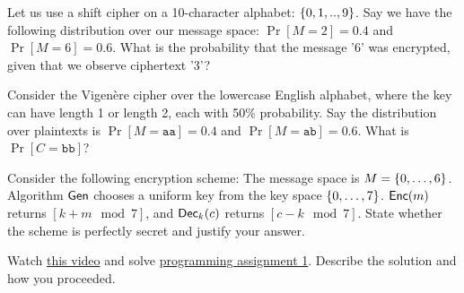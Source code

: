 \documentclass[a4paper,10pt]{article}
\begin{document}
\begin{question}{1}
Let us use a shift cipher on a 10-character alphabet: $\{0,1,..,9\}$. Say we have the following distribution over our message space:
$\Pr[M=2]=0.4$ and $\Pr[M=6]=0.6$. What is the probability that the message '6' was encrypted, given that we observe ciphertext '3'?
\end{question}

\begin{solution}
\end{solution}


\begin{question}{1}
Consider the Vigenère cipher over the lowercase English alphabet, where the key can have length 1 or length 2, each with 50\% probability. Say the distribution over plaintexts is $\Pr[M=\mathtt{aa}]=0.4$ and $\Pr[M=\mathtt{ab}]=0.6$. What is $\Pr[C=\mathtt{bb}]$?
\end{question}

\begin{solution}
\end{solution}

\begin{question}{2}
 Consider the following encryption scheme: The message space is $M=\{0,\ldots,6\}$. Algorithm $\mathsf{Gen}$ chooses a uniform key from the key space $\{0, \ldots,7\}$. $\mathsf{Enc}(m)$ returns $[k+m \mod 7]$, and $\mathsf{Dec}_k(c)$ returns $[c-k \mod 7]$. State whether the scheme is perfectly secret and justify your answer.
\end{question}

\begin{solution}
\end{solution}


\begin{programming}{5}
Watch \href{https://www.coursera.org/learn/cryptography/lecture/01t8O/breaking-the-vigenere-cipher}{this video} and solve \href{https://www.coursera.org/learn/cryptography/supplement/7mgaE/programming-assignment-1}{programming assignment 1}. Describe the solution and how you proceeded.
\end{programming}

\begin{solution}
\end{solution}
\end{document}
